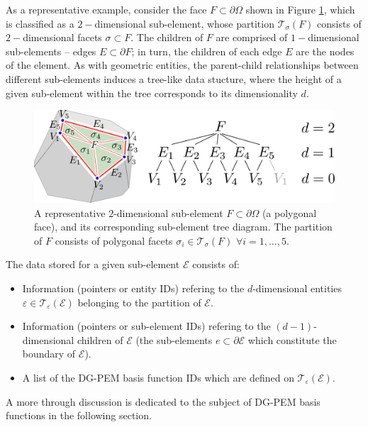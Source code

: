 	As a representative example, consider the face $F \subset \partial \Omega$ shown in Figure \ref{fig:sub_element}, which is classified as a $2-$dimensional sub-element, whose partition $\mathcal{T}_\sigma (F)$ consists of $2-$dimensional facets $\sigma \subset F$. The children of $F$ are comprised of $1-$dimensional sub-elements -- edges $E \subset \partial F$; in turn, the children of each edge $E$ are the nodes of the element. As with geometric entities, the parent-child relationships between different sub-elements induces a tree-like data stucture, where the height of a given sub-element within the tree corresponds to its dimensionality $d$.
	\begin{figure} [!ht]
		\centering
		\includegraphics[width = 6.0in]{figures/sub_element.pdf}
		\caption{A representative $2$-dimensional sub-element $F \subset \partial \Omega$ (a polygonal face), and its corresponding sub-element tree diagram. The partition of $F$ consists of polygonal facets $\sigma_i \in \mathcal{T}_{\sigma} (F) \, \, \forall i = 1, \ldots, 5$.}
		\label{fig:sub_element}
	\end{figure}
	
	The data stored for a given sub-element $\mathcal{E}$ consists of:
	\begin{itemize}
		\item Information (pointers or entity IDs) refering to the $d$-dimensional entities $\varepsilon \in \mathcal{T}_\varepsilon (\mathcal{E})$ belonging to the partition of $\mathcal{E}$.
		\item Information (pointers or sub-element IDs) refering to the $(d-1)$-dimensional children of $\mathcal{E}$ (the sub-elements $e \subset \partial \mathcal{E}$ which constitute the boundary of $\mathcal{E}$).
		\item A list of the DG-PEM basis function IDs which are defined on $\mathcal{T}_\varepsilon (\mathcal{E})$.
	\end{itemize}
	
	A more through discussion is dedicated to the subject of DG-PEM basis functions in the following section.
	

